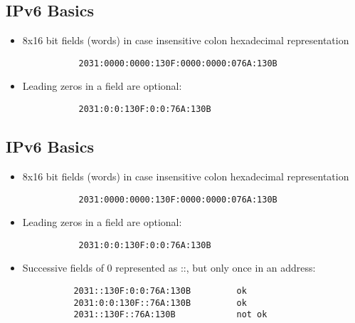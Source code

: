 \documentclass[xga]{xdvislides}
\begin{document}
\subsection{IPv6 Basics}
\begin{itemize}
	\item 8x16 bit fields (words) in case insensitive colon hexadecimal
		representation
\begin{verbatim}
           2031:0000:0000:130F:0000:0000:076A:130B
\end{verbatim}
	\item Leading zeros in a field are optional:
\begin{verbatim}
           2031:0:0:130F:0:0:76A:130B
\end{verbatim}
\end{itemize}

\subsection{IPv6 Basics}
\begin{itemize}
	\item 8x16 bit fields (words) in case insensitive colon hexadecimal
		representation
\begin{verbatim}
           2031:0000:0000:130F:0000:0000:076A:130B
\end{verbatim}
	\item Leading zeros in a field are optional:
\begin{verbatim}
           2031:0:0:130F:0:0:76A:130B
\end{verbatim}
	\item Successive fields of 0 represented as ::, but only once in
			an address:
\begin{verbatim}
          2031::130F:0:0:76A:130B         ok
          2031:0:0:130F::76A:130B         ok
          2031::130F::76A:130B            not ok
\end{verbatim}
\end{itemize}
\end{document}
